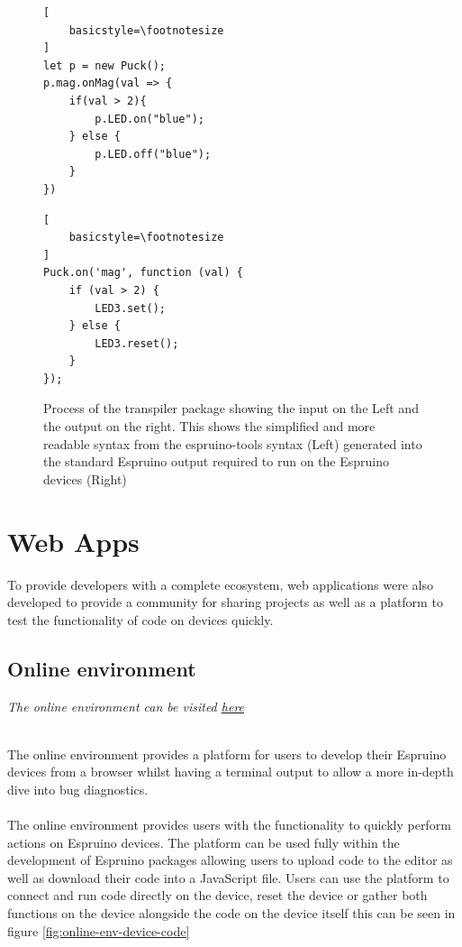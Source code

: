 \documentclass{l4proj}
\begin{document}
\begin{figure}[!ht]
\centering
\begin{minipage}{6cm}
  \centering
  \begin{lstlisting}[
    basicstyle=\footnotesize
]
let p = new Puck();
p.mag.onMag(val => {
    if(val > 2){
        p.LED.on("blue");
    } else {
        p.LED.off("blue");
    }
})

  \end{lstlisting}
\end{minipage}
\hspace{0.5cm}
\begin{minipage}{6cm}
  \centering
  
  \begin{lstlisting}[
    basicstyle=\footnotesize
]
Puck.on('mag', function (val) {
    if (val > 2) {
        LED3.set();
    } else {
        LED3.reset();
    }
});
  \end{lstlisting}
\end{minipage}


  \caption{Process of the transpiler package showing the input on the Left and the output on the right. This shows the simplified and more readable syntax from the espruino-tools syntax (Left) generated into the standard Espruino output required to run on the Espruino devices (Right)}
  \label{fig:transpiler-input-output}

\end{figure}

\section{Web Apps}
To provide developers with a complete ecosystem, web applications were also developed to provide a community for sharing projects as well as a platform to test the functionality of code on devices quickly.

\subsection{Online environment}
\begin{center}
\textit{The online environment can be visited \href{https://online-environment.vercel.app/}{here}} 
\end{center}
\\
\text The online environment provides a platform for users to develop their Espruino devices from a browser whilst having a terminal output to allow a more in-depth dive into bug diagnostics.
\\ \\
The online environment provides users with the functionality to quickly perform actions on Espruino devices. The platform can be used fully within the development of Espruino packages allowing users to upload code to the editor as well as download their code into a JavaScript file. Users can use the platform to connect and run code directly on the device, reset the device or gather both functions on the device alongside the code on the device itself this can be seen in figure \ref{fig:online-env-device-code}
\end{document}
